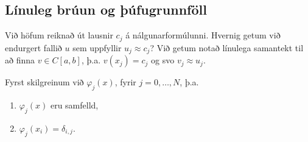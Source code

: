\documentclass[a4paper,10pt,icelandic]{sphinxmanual}
\begin{document}


\subsection{Línuleg brúun og þúfugrunnföll}
\label{\detokenize{Kafli05:linuleg-bruun-og-ufugrunnfoll}}\label{\detokenize{Kafli05:ch-5-2-2}}
Við höfum reiknað út lausnir \(c_j\) á nálgunarformúlunni.
Hvernig getum við endurgert fallið \(u\) sem uppfyllir \(u_j \approx c_j\)?
Við getum notað línulega samantekt til að finna  \(v\in C[a,b]\), þ.a. \(v(x_j)= c_j\) og svo \(v_j \approx u_j\).

Fyrst skilgreinum við  \(\varphi_j(x)\), fyrir \(j=0, \dots, N\), þ.a.
\begin{enumerate}
\def\theenumi{\arabic{enumi}}
\def\labelenumi{\theenumi .}
\makeatletter\def\p@enumii{\p@enumi \theenumi .}\makeatother
\item {} 
\(\varphi_j(x)\) eru samfelld,

\item {} 
\(\varphi_j(x_i)=\delta_{i,j}\).

\end{enumerate}
\end{document}
